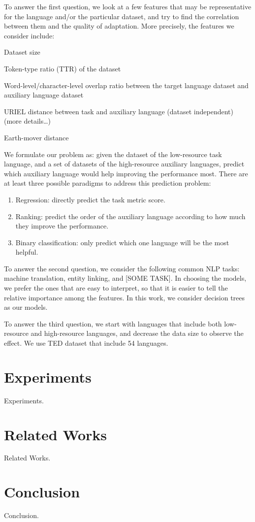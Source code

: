 \documentclass[11pt,a4paper,usenames,dvipsnames]{article}
\begin{document}
To answer the first question, we look at a few features that may be representative for the language and/or the particular dataset, and try to find the correlation between them and the quality of adaptation. More precisely, the features we consider include:

\begin{enumerate}
\item Dataset size
\item Token-type ratio (TTR) of the dataset
\item Word-level/character-level overlap {\color{red}ratio} between the target language dataset and auxiliary language dataset
\item URIEL distance between task and auxiliary language (dataset independent) {\color{blue}(more details\dots)}
{\color{blue}\item Earth-mover distance}
\end{enumerate}

\noindent We formulate our problem as: given the dataset of the low-resource task language, and a set of datasets of the high-resource auxiliary languages, predict which auxiliary language would help improving the performance most. There are at least three possible paradigms to address this prediction problem:

\begin{enumerate}

\item Regression: directly predict the task metric score.

\item Ranking: predict the order of the auxiliary language according to how much they improve the performance.

\item Binary classification: only predict which one language will be the most helpful.

\end{enumerate}

To answer the second question, we consider the following common NLP tasks: machine translation, entity linking, and {\color{blue}[SOME TASK]}. In choosing the models, we prefer the ones that are easy to interpret, so that it is easier to tell the relative importance among the features. In this work, we consider decision trees as our models.

To answer the third question, we start with languages that include both low-resource and high-resource languages, and decrease the data size to observe the effect. We use TED dataset that include 54 languages.


\section{Experiments}

{\color{blue}Experiments.}


\section{Related Works}

{\color{blue}Related Works.}


\section{Conclusion}

{\color{blue}Conclusion.}




\end{document}
